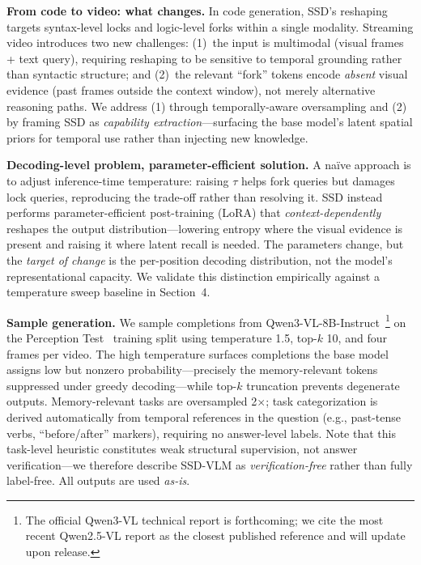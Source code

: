 \documentclass[11pt,a4paper]{article}
\begin{document}
\textbf{From code to video: what changes.} In code generation, SSD's reshaping targets syntax-level locks and logic-level forks within a single modality. Streaming video introduces two new challenges: (1)~the input is multimodal (visual frames + text query), requiring reshaping to be sensitive to temporal grounding rather than syntactic structure; and (2)~the relevant ``fork'' tokens encode \textit{absent} visual evidence (past frames outside the context window), not merely alternative reasoning paths. We address (1) through temporally-aware oversampling and (2) by framing SSD as \textit{capability extraction}---surfacing the base model's latent spatial priors for temporal use rather than injecting new knowledge.

\textbf{Decoding-level problem, parameter-efficient solution.} A na\"ive approach is to adjust inference-time temperature: raising $\tau$ helps fork queries but damages lock queries, reproducing the trade-off rather than resolving it. SSD instead performs parameter-efficient post-training (LoRA) that \textit{context-dependently} reshapes the output distribution---lowering entropy where the visual evidence is present and raising it where latent recall is needed. The parameters change, but the \textit{target of change} is the per-position decoding distribution, not the model's representational capacity. We validate this distinction empirically against a temperature sweep baseline in Section~4.

\textbf{Sample generation.} We sample completions from Qwen3-VL-8B-Instruct~\cite{qwen3vl}\footnote{The official Qwen3-VL technical report is forthcoming; we cite the most recent Qwen2.5-VL report as the closest published reference and will update upon release.} on the Perception Test~\cite{perceptiontest} training split using temperature 1.5, top-$k$ 10, and four frames per video. The high temperature surfaces completions the base model assigns low but nonzero probability---precisely the memory-relevant tokens suppressed under greedy decoding---while top-$k$ truncation prevents degenerate outputs. Memory-relevant tasks are oversampled 2$\times$; task categorization is derived automatically from temporal references in the question (e.g., past-tense verbs, ``before/after'' markers), requiring no answer-level labels. Note that this task-level heuristic constitutes weak structural supervision, not answer verification---we therefore describe SSD-VLM as \textit{verification-free} rather than fully label-free. All outputs are used \textit{as-is}.
\end{document}
